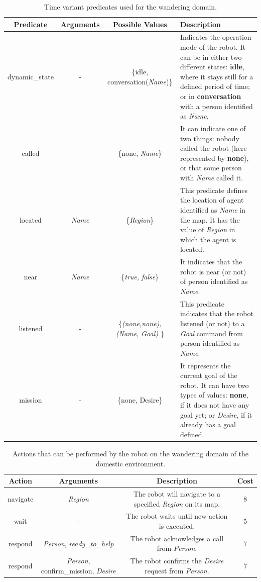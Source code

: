 \begin{table}[H]
    \begin{tabularx}{\textwidth}{ |c|c|c|X| }
     \hline
     Predicate & Arguments &  Possible Values  & Description\\
     \hline
     dynamic\_state   &  -  &   \{idle, conversation(\textit{Name})\}    &
     Indicates the operation mode of the
     robot. It can be in either two different states: \textbf{idle}, where it
     stays still for a defined period of time; or in \textbf{conversation} with
     a person identified as \textit{Name}.\\
     called &   -   &   \{none, \textit{Name}\}  &   It can indicate one of two
     things: nobody called the robot (here represented by \textbf{none}), or
     that some person with \textit{Name} called it. \\
     located    &   \textit{Name}   &   \{\textit{Region}\} & This predicate
     defines the location of agent identified as \textit{Name} in the map. It
     has the value of \textit{Region} in which the agent is located.\\
     near   &   \textit{Name}   &   \{\textit{true, false}\}    &   It indicates
     that the robot is near (or not) of person identified as \textit{Name}.  \\
     listened   &   -   &   \{\textit{(none,none), (Name, Goal) }\} &
     This predicate indicates that the robot listened (or not) to a
     \textit{Goal} command from person identified as \textit{Name}.\\
     mission    &   -  &    \{none, Desire\}  &   It represents the current
     goal of the robot. It can have two types of values: \textbf{none}, if it
     does not have any goal yet; or \textit{Desire}, if it already has a goal
     defined.\\
     \hline
    \end{tabularx}
    \caption{Time variant predicates used for the wandering domain.}
    \label{table:dyn_preds_wandering}
\end{table}



\begin{table}[H]
    \begin{tabular}{ |c|c|c|c| }
     \hline
     Action & Arguments & Description & Cost\\
     \hline
     navigate   &   \textit{Region}  &   The robot will navigate to a specified
     \textit{Region} on its map. & 8\\
     wait   &   -   &   The robot waits until new action is executed. & 5\\
     respond & \textit{Person}, \textit{ready\_to\_help} & The robot
     acknowledges a call from \textit{Person}. & 7\\
     respond & \textit{Person}, confirm\_mission, \textit{Desire} & The robot
     confirms the \textit{Desire} request from \textit{Person}. & 7\\
     \hline
    \end{tabular}
    \caption{Actions that can be performed by the robot on the wandering domain of 
    the domestic environment.}
    \label{table:actions_wandering}
\end{table}

